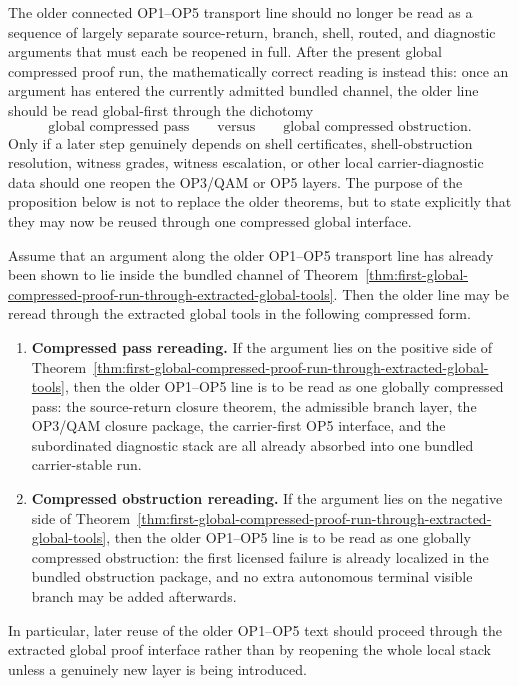 \begin{remark}
The older connected OP1--OP5 transport line should no longer be read as a sequence of largely separate source-return, branch, shell, routed, and diagnostic arguments that must each be reopened in full. After the present global compressed proof run, the mathematically correct reading is instead this: once an argument has entered the currently admitted bundled channel, the older line should be read global-first through the dichotomy
\[
\text{global compressed pass}
\qquad\text{versus}\qquad
\text{global compressed obstruction}.
\]
Only if a later step genuinely depends on shell certificates, shell-obstruction resolution, witness grades, witness escalation, or other local carrier-diagnostic data should one reopen the OP3/QAM or OP5 layers. The purpose of the proposition below is not to replace the older theorems, but to state explicitly that they may now be reused through one compressed global interface.
\end{remark}

\begin{proposition}
\label{prop:compressed-rereading-of-the-older-op1-op5-line-through-the-extracted-global-tools}
Assume that an argument along the older OP1--OP5 transport line has already been shown to lie inside the bundled channel of Theorem~\ref{thm:first-global-compressed-proof-run-through-extracted-global-tools}. Then the older line may be reread through the extracted global tools in the following compressed form.
\begin{enumerate}[leftmargin=2em,label=(\roman*)]
\item \textbf{Compressed pass rereading.}
If the argument lies on the positive side of Theorem~\ref{thm:first-global-compressed-proof-run-through-extracted-global-tools}, then the older OP1--OP5 line is to be read as one globally compressed pass: the source-return closure theorem, the admissible branch layer, the OP3/QAM closure package, the carrier-first OP5 interface, and the subordinated diagnostic stack are all already absorbed into one bundled carrier-stable run.
\item \textbf{Compressed obstruction rereading.}
If the argument lies on the negative side of Theorem~\ref{thm:first-global-compressed-proof-run-through-extracted-global-tools}, then the older OP1--OP5 line is to be read as one globally compressed obstruction: the first licensed failure is already localized in the bundled obstruction package, and no extra autonomous terminal visible branch may be added afterwards.
\end{enumerate}
In particular, later reuse of the older OP1--OP5 text should proceed through the extracted global proof interface rather than by reopening the whole local stack unless a genuinely new layer is being introduced.
\end{proposition}

